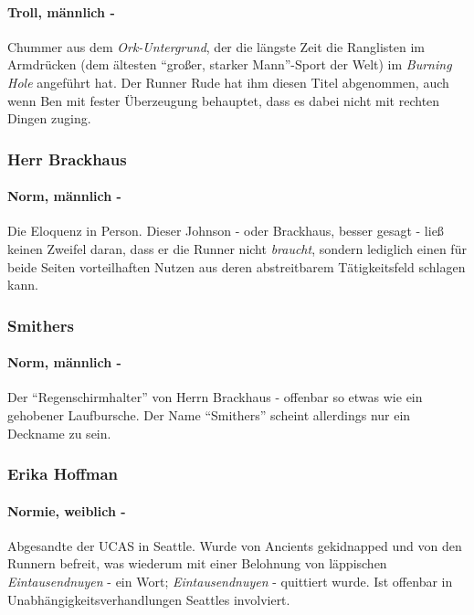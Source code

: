     \paragraph{Troll, männlich -} Chummer aus dem \textit{Ork-Untergrund}, der die längste Zeit die Ranglisten im Armdrücken (dem ältesten ``großer, starker Mann''-Sport der Welt) im \textit{Burning Hole} angeführt hat. Der Runner Rude hat ihm diesen Titel abgenommen, auch wenn Ben mit fester Überzeugung behauptet, dass es dabei nicht mit rechten Dingen zuging.
    
    
    \subsubsection{Herr Brackhaus}
    \paragraph{Norm, männlich -} Die Eloquenz in Person. Dieser Johnson - oder Brackhaus, besser gesagt - ließ keinen Zweifel daran, dass er die Runner nicht \textit{braucht}, sondern lediglich einen für beide Seiten vorteilhaften Nutzen aus deren abstreitbarem Tätigkeitsfeld schlagen kann. %
    
    \subsubsection{Smithers}
    \paragraph{Norm, männlich -} Der ``Regenschirmhalter'' von Herrn Brackhaus - offenbar so etwas wie ein gehobener Laufbursche. Der Name ``Smithers'' scheint allerdings nur ein Deckname zu sein.
    
    
    \subsubsection{Erika Hoffman}
    \paragraph{Normie, weiblich -} Abgesandte der UCAS in Seattle. Wurde von Ancients gekidnapped und von den Runnern befreit, was wiederum mit einer Belohnung von läppischen \textit{Eintausendnuyen} - ein Wort; \textit{Eintausendnuyen} - quittiert wurde. Ist offenbar in Unabhängigkeitsverhandlungen Seattles involviert.
    
